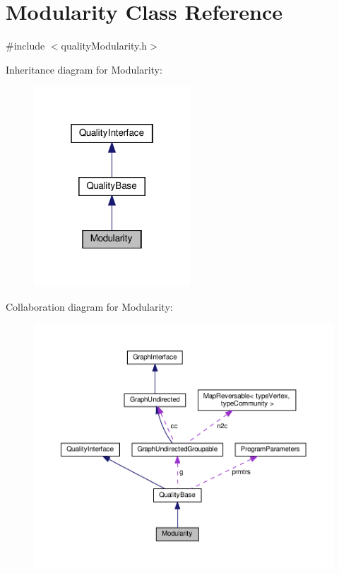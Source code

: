 \hypertarget{classModularity}{}\section{Modularity Class Reference}
\label{classModularity}


{\ttfamily \#include $<$quality\+Modularity.\+h$>$}



Inheritance diagram for Modularity\+:
\nopagebreak
\begin{figure}[H]
\begin{center}
\leavevmode
\includegraphics[width=166pt]{classModularity__inherit__graph}
\end{center}
\end{figure}


Collaboration diagram for Modularity\+:
\nopagebreak
\begin{figure}[H]
\begin{center}
\leavevmode
\includegraphics[width=350pt]{classModularity__coll__graph}
\end{center}
\end{figure}
